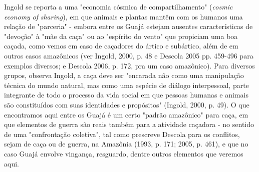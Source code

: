 Ingold se reporta a uma "economia cósmica de compartilhamento"
(\emph{cosmic} \emph{economy} \emph{of} \emph{sharing}), em que animais
e plantas mantêm com os humanos uma relação de "parceria" - embora entre
os Guajá estejam ausentes características de "devoção" à "mãe da caça"
ou ao "espírito do vento" que propiciam uma boa caçada, como vemos em
caso de caçadores do ártico e subártico, além de em outros casos
amazônicos (ver Ingold, 2000, p. 48 e Descola 2005 pp. 459-496 para
exemplos diversos; e Descola 2006, p. 172, pra um caso amazônico). Para
diversos grupos, observa Ingold, a caça deve ser "encarada não como uma
manipulação técnica do mundo natural, mas como uma espécie de diálogo
interpessoal, parte integrante de todo o processo da vida social em que
pessoas humanas e animais são constituídos com suas identidades e
propósitos" (Ingold, 2000, p. 49). O que encontramos aqui entre os Guajá
é um certo "padrão amazônico" para caça, em que elementos de guerra são
reais também para a atividade caçadora - no sentido de uma "confrontação
coletiva", tal como prescreve Descola para os conflitos, sejam de caça
ou de guerra, na Amazônia (1993, p. 171; 2005, p. 461), e que no caso
Guajá envolve vingança, resguardo, dentre outros elementos que veremos
aqui.

